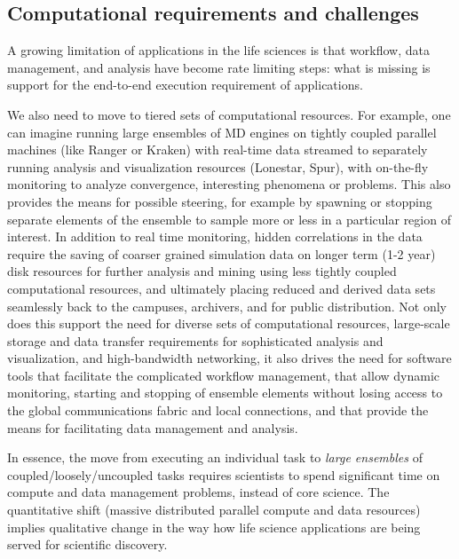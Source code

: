 \documentclass{sig-alternate}
\begin{document}
\subsection{Computational requirements and challenges}

A growing limitation of applications in the life sciences is that workflow, data management, and
analysis have become rate limiting steps: what is missing is support for the end-to-end execution requirement of applications.

We also need to move to tiered sets of computational resources.  For
example, one can imagine running large ensembles of MD engines on
tightly coupled parallel machines (like Ranger or Kraken) with
real-time data streamed to separately running analysis and
visualization resources (Lonestar, Spur), with on-the-fly monitoring
to analyze convergence, interesting phenomena or problems.  This also
provides the means for possible steering, for example by spawning or
stopping separate elements of the ensemble to sample more or less in a
particular region of interest.  In addition to real time monitoring,
hidden correlations in the data require the saving of coarser grained
simulation data on longer term (1-2 year) disk resources for further
analysis and mining using less tightly coupled computational
resources, and ultimately placing reduced and derived data sets
seamlessly back to the campuses, archivers, and for public
distribution.  Not only does this support the need for diverse sets of
computational resources, large-scale storage and data transfer
requirements for sophisticated analysis and visualization, and
high-bandwidth networking, it also drives the need for software tools
that facilitate the complicated workflow management, that allow
dynamic monitoring, starting and stopping of ensemble elements without
losing access to the global communications fabric and local
connections, and that provide the means for facilitating data
management and analysis.

In essence, the move from executing an individual task to \textit{large
  ensembles} of coupled/loosely/uncoupled tasks requires scientists to spend
significant time on compute and data management problems, instead of
core science.  The quantitative shift (massive distributed parallel
compute and data resources) implies qualitative change in the way how life science applications are being served for scientific discovery. 

\end{document}

